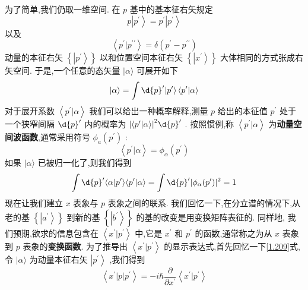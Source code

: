 \documentclass[lang=cn,newtx,10pt,scheme=chinese,thmcnt=section]{elegantbook}
\begin{document}
为了简单,我们仍取一维空间. 在 $p$ 基中的基本征右矢规定
\begin{equation}
	p\left| {p}^{\prime }\right\rangle = {p}^{\prime }\left| {p}^{\prime }\right\rangle
\end{equation}
以及
\begin{equation}
	\left\langle {{p}^{\prime } | {p}^{\prime \prime }}\right\rangle = \delta \left( {{p}^{\prime } - {p}^{\prime \prime }}\right)
\end{equation}
动量的本征右矢 $\left\{ \left| {p}^{\prime }\right\rangle \right\}$ 以和位置空间本征右矢 $\left\{ \left| {x}^{\prime }\right\rangle \right\}$ 大体相同的方式张成右矢空间. 于是,一个任意的态矢量 $|\alpha \rangle$ 可展开如下
\begin{equation}
	| {\alpha \rangle = \int \d{p}^{\prime }}| {p}^{\prime }\rangle \left\langle {{p}^{\prime } | \alpha }\right\rangle
\end{equation}
对于展开系数 $\left\langle {{p}^{\prime } | \alpha }\right\rangle$ 我们可以给出一种概率解释,测量 $p$ 给出的本征值 ${p}^{\prime }$ 处于一个狭窄间隔 $\d{p}^{\prime }$ 内的概率为 ${\left| \left\langle {p}^{\prime } | \alpha \right\rangle \right| }^{2}\d{p}^{\prime }$ . 按照惯例,称 $\left\langle {{p}^{\prime } | \alpha }\right\rangle$ 为\textbf{动量空间波函数},通常采用符号 ${\phi }_{a}\left( {p}^{\prime }\right)$ :
\begin{equation}
	\left\langle {{p}^{\prime } | \alpha }\right\rangle = {\phi }_{\alpha }\left( {p}^{\prime }\right) 
\end{equation}
如果 $|\alpha \rangle$ 已被归一化了,则我们得到
\begin{equation}
	\int \d{p}^{\prime }\langle {\alpha | {{p}^{\prime }\rangle \langle {{p}^{\prime } | \alpha }\rangle = \int \d{p}^{\prime }}| {\phi }_{\alpha }( {p}^{\prime }) {| }^{2} = 1}
\end{equation}
现在让我们建立 $x$ 表象与 $p$ 表象之间的联系. 我们回忆一下,在分立谱的情况下,从老的基 $\left\{ \left| {a}^{\prime }\right\rangle \right\}$ 到新的基 $\left\{ \left| {b}^{\prime }\right\rangle \right\}$ 的基的改变是用变换矩阵表征的. 同样地, 我们预期,欲求的信息包含在 $\left\langle {{x}^{\prime } | {p}^{\prime }}\right\rangle$ 中,它是 ${x}^{\prime }$ 和 ${p}^{\prime }$ 的函数,通常称之为从 $x$ 表象到 $p$ 表象的\textbf{变换函数}. 为了推导出 $\left\langle {{x}^{\prime } | {p}^{\prime }}\right\rangle$ 的显示表达式,首先回忆一下\ref{1.209}式, 令 $|\alpha \rangle$ 为动量本征右矢 $\left| {p}^{\prime }\right\rangle$ ,我们得到
\begin{equation}
	\left\langle {{x}^{\prime }\left| p\right| {p}^{\prime }}\right\rangle = - i\hbar \frac{\partial }{\partial {x}^{\prime }}\left\langle {{x}^{\prime } | {p}^{\prime }}\right\rangle
\end{equation}
\end{document}
